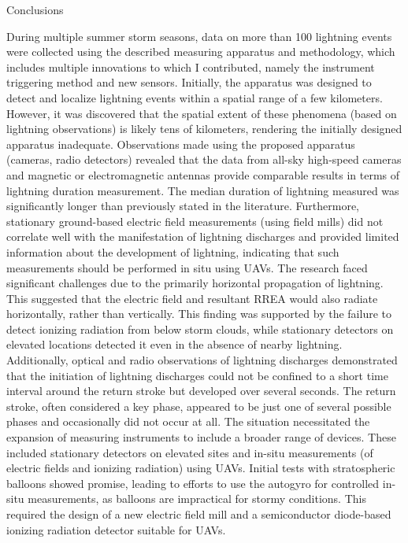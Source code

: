 \sec Conclusions

During multiple summer storm seasons, data on more than 100 lightning events were collected using the described measuring apparatus and methodology, which includes multiple innovations to which I contributed, namely the instrument triggering method and new sensors. Initially, the apparatus was designed to detect and localize lightning events within a spatial range of a few kilometers. However, it was discovered that the spatial extent of these phenomena (based on lightning observations) is likely tens of kilometers, rendering the initially designed apparatus inadequate.
Observations made using the proposed apparatus (cameras, radio detectors) revealed that the data from all-sky high-speed cameras and magnetic or electromagnetic antennas provide comparable results in terms of lightning duration measurement. The median duration of lightning measured was significantly longer than previously stated in the literature. Furthermore, stationary ground-based electric field measurements (using field mills) did not correlate well with the manifestation of lightning discharges and provided limited information about the development of lightning, indicating that such measurements should be performed in situ using UAVs.
The research faced significant challenges due to the primarily horizontal propagation of lightning. This suggested that the electric field and resultant RREA would also radiate horizontally, rather than vertically. This finding was supported by the failure to detect ionizing radiation from below storm clouds, while stationary detectors on elevated locations detected it even in the absence of nearby lightning.
Additionally, optical and radio observations of lightning discharges demonstrated that the initiation of lightning discharges could not be confined to a short time interval around the return stroke but developed over several seconds. The return stroke, often considered a key phase, appeared to be just one of several possible phases and occasionally did not occur at all.
The situation necessitated the expansion of measuring instruments to include a broader range of devices. These included stationary detectors on elevated sites and in-situ measurements (of electric fields and ionizing radiation) using UAVs. Initial tests with stratospheric balloons showed promise, leading to efforts to use the autogyro for controlled in-situ measurements, as balloons are impractical for stormy conditions. This required the design of a new electric field mill and a semiconductor diode-based ionizing radiation detector suitable for UAVs.
